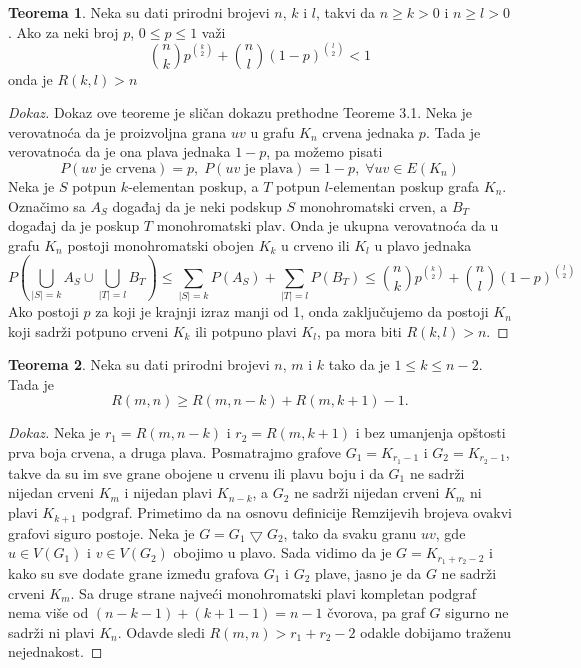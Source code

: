\documentclass{article}
\theoremstyle{definition}
\newtheorem{teorema}{Teorema}[section]
\newcommand{\dokaz}[1]{\begin{proof}[Dokaz]#1\end{proof}}
\begin{document}
	\begin{teorema}\label{dot2}
		Neka su dati prirodni brojevi $n$, $k$ i $l$, takvi da $n \geq{k} > 0$ i $n \geq{l} > 0$. Ako za neki broj $p$, $0 \leq{p} \leq 1$ važi
		$$\binom{n}{k}p^{\binom{k}{2}} + \binom{n}{l}(1 - p)^{\binom{l}{2}} < 1$$ onda je $R(k,l) > n$
		\dokaz{
			Dokaz ove teoreme je sličan dokazu prethodne Teoreme 3.1. Neka je verovatnoća da je proizvoljna grana $uv$ u grafu $K_n$ crvena jednaka $p$. Tada je verovatnoća da je ona               	plava jednaka $1 - p$, pa možemo pisati 
			$$P(uv \text{ je crvena}) = p,\; P(uv \text{ je plava}) = 1 - p, \; \forall uv \in E(K_n)$$
			Neka je $S$ potpun $k$-elementan poskup, a $T$ potpun $l$-elementan poskup grafa $K_n$. Označimo sa $A_S$ događaj da je neki podskup $S$ monohromatski crven, a $B_T$ događaj  	da je poskup $T$ monohromatski plav. Onda je ukupna verovatnoća da u grafu $K_n$ postoji monohromatski obojen $K_k$ u crveno ili $K_l$ u plavo jednaka
			$$P\left(\bigcup_{|S|=k}A_S \cup \bigcup_{|T|=l}B_T \right) \leq \sum_{|S|=k}P(A_S) + \sum_{|T|=l}P(B_T) \leq \binom{n}{k}p^{\binom{k}{2}} + \binom{n}{l}(1 - p)^{\binom{l}{2}}$$
			Ako postoji $p$ za koji je krajnji izraz manji od 1, onda zaključujemo da postoji $K_n$  koji sadrži potpuno crveni $K_k$ ili potpuno plavi $K_l$, pa mora biti $R(k,l)>n$.
		}
	\end{teorema}
	\begin{teorema}\label{dot3}
		Neka su dati prirodni brojevi $n$, $m$ i $k$ tako da je $1\leq k \leq n - 2$. Tada je $$R(m,n) \geq R(m, n - k) + R(m, k + 1) - 1.$$ 
		\dokaz{
			Neka je $r_1 = R(m, n - k)$ i $r_2 = R(m, k + 1)$ i bez umanjenja opštosti prva boja crvena, a druga plava. Posmatrajmo grafove 
			$G_1 =K_{r_1 - 1}$ i $G_2 = K_{r_2 - 1}$, takve da su im sve grane obojene u crvenu ili plavu boju i da $G_1$ ne sadrži nijedan crveni $K_m$ i
			nijedan plavi $K_{n - k}$, a $G_2$ ne sadrži nijedan crveni $K_m$ ni plavi $K_{k + 1}$ podgraf. Primetimo da na osnovu definicije Remzijevih
			brojeva ovakvi grafovi siguro postoje. Neka je $G = G_1 \bigtriangledown G_2$, tako da svaku granu $uv$, gde $u \in V(G_1)$ i $v \in V(G_2)$
			obojimo u plavo. Sada vidimo da je $G = K_{r_1 + r_2 - 2}$ i kako su sve dodate grane između grafova $G_1$ i $G_2$ plave, jasno je da $G$ ne
			sadrži crveni $K_m$. Sa druge strane najveći monohromatski plavi kompletan podgraf nema više od $(n - k - 1) + (k + 1 - 1) = n - 1$ čvorova, pa 			graf $G$ sigurno ne sadrži ni plavi $K_n$. Odavde sledi $R(m,n) > r_1 + r_2 - 2$ odakle dobijamo traženu nejednakost. 
		}
	\end{teorema}
\end{document}
